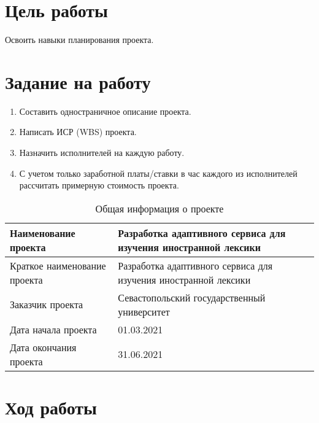 \documentclass[a4paper,14pt]{extarticle}
\begin{document}


\section{Цель работы}
Освоить навыки планирования проекта.

\section{Задание на работу}
\begin{enumerate}
    \item Составить одностраничное описание проекта.
    \item Написать ИСР (WBS) проекта.
    \item Назначить исполнителей на каждую работу.
    \item С учетом только заработной платы/ставки в час каждого из исполнителей рассчитать примерную стоимость проекта.
\end{enumerate}

\begin{table}[H]
    \caption{Общая информация о проекте}
    \begin{tabular}{ | p{5.5cm} | p{11cm} | }
        \hline
        Наименование проекта & Разработка адаптивного сервиса для изучения иностранной лексики \\ \hline
        Краткое наименование проекта & Разработка адаптивного сервиса для изучения иностранной лексики \\ \hline
        Заказчик проекта & Севастопольский государственный университет \\ \hline
        Дата начала проекта & 01.03.2021 \\ \hline
        Дата окончания проекта & 31.06.2021 \\ \hline
    \end{tabular}
\end{table}

\section{Ход работы}
\end{document}
